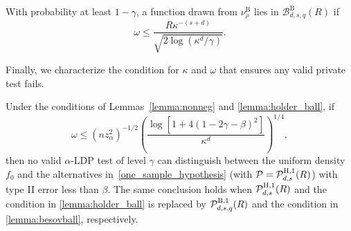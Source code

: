 \documentclass[twoside,11pt]{article}
\newcommand{\distClassGeneric}{\mathcal{P}}
\newcommand{\dimDensity}{d} %
\newcommand{\smoothness}{s}
\newcommand{\ballRadius}{R}
\newcommand{\privacyParameter}{\alpha} %
\newcommand{\maxErrorTypeOne}{\gamma} %
\newcommand{\binNum}{\kappa}           %
\newcommand{\besovParamMicroscope}{q}
\newcommand{\ballDistn}{\mathcal{B}}
\newcommand{\besovBall}[2]{\ballDistn_{\dimDensity,\smoothness, #2}^{\mathrm{B}}(\ballRadius)}
\newcommand{\pBesovGof}{ %
	\distClassGeneric_{%
		\dimDensity, \smoothness, \besovParamMicroscope
	}^{%
		\mathrm{B,1}
	}
	(\ballRadius)
}
\newcommand{\pHolderGof}{ %
	\distClassGeneric_{%
		\dimDensity, \smoothness
	}^{%
		\mathrm{H,1}
	}
	(\ballRadius)
}
\begin{document}
\begin{appendix}
	\begin{lemma}\label{lemma:besovball}
		With probability at least $1-\maxErrorTypeOne$,
		a function drawn from  $\nu_\rho^{}$ lies in $\besovBall{}{\besovParamMicroscope}$ if 
		\begin{equation}
			\omega \leq
			\frac{\ballRadius \binNum^{-(\smoothness + \dimDensity)}}{
				\sqrt{
					2\log(\binNum^\dimDensity/\maxErrorTypeOne)
				}
			}.
		\end{equation}
	\end{lemma}
	Finally, we characterize the condition for $\binNum$ and $\omega$ that ensures any valid private test fails.
	\begin{lemma}[Indistinguishability]\label{lemma:indistinguishability}
		Under the conditions of Lemmas~\ref{lemma:nonneg} and \ref{lemma:holder_ball}, if \begin{equation} \label{eq:two_sample_lower_bound_main_suff_1}
			\omega
			\leq
			(n z_\privacyParameter^2)^{-1/2}
			\left(
			\frac{\log \left[ 1 + 4(1- 2\gamma - \beta)^2\right]}{\binNum^{\dimDensity}}
			\right)^{1/4},
		\end{equation} 
		then no valid $\privacyParameter$-LDP test of level $\gamma$ can distinguish between the uniform density $f_0$ and the alternatives in~\eqref{one_sample_hypothesis} (with $\distClassGeneric = \pHolderGof$) with type II error less than $\beta$. The same conclusion holds when $\pHolderGof$ and the condition in \ref{lemma:holder_ball} is replaced by $\pBesovGof$ and the condition in \ref{lemma:besovball}, respectively. \end{lemma}

\end{appendix}
\end{document}
